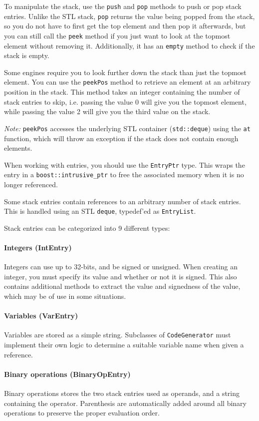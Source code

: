 To manipulate the stack, use the \verb+push+ and \verb+pop+ methods to push or pop stack entries. Unlike the STL stack, \verb+pop+ returns the value being popped from the stack, so you do not have to first get the top element and then pop it afterwards, but you can still call the \verb+peek+ method if you just want to look at the topmost element without removing it. Additionally, it has an \verb+empty+ method to check if the stack is empty.

Some engines require you to look further down the stack than just the topmost element. You can use the \verb+peekPos+ method to retrieve an element at an arbitrary position in the stack. This method takes an integer containing the number of stack entries to skip, i.e. passing the value 0 will give you the topmost element, while passing the value 2 will give you the third value on the stack.

\emph{Note:} \verb+peekPos+ accesses the underlying STL container (\verb+std::deque+) using the \verb+at+ function, which will throw an exception if the stack does not contain enough elements.

When working with entries, you should use the \verb+EntryPtr+ type. This wraps the entry in a \verb+boost::intrusive_ptr+ to free the associated memory when it is no longer referenced.

Some stack entries contain references to an arbitrary number of stack entries. This is handled using an STL \verb+deque+, typedef'ed as \verb+EntryList+.

Stack entries can be categorized into 9 different types:

\paragraph{Integers (IntEntry)}
Integers can use up to 32-bits, and be signed or unsigned. When creating an integer, you must specify its value and whether or not it is signed. This also contains additional methods to extract the value and signedness of the value, which may be of use in some situations.

\paragraph{Variables (VarEntry)}
Variables are stored as a simple string. Subclasses of \verb+CodeGenerator+ must implement their own logic to determine a suitable variable name when given a reference.

\paragraph{Binary operations (BinaryOpEntry)}
Binary operations stores the two stack entries used as operands, and a string containing the operator. Parenthesis are automatically added around all binary operations to preserve the proper evaluation order.

